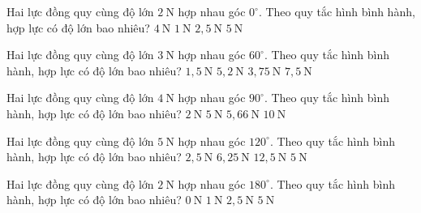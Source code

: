 \begin{ex}
Hai lực đồng quy cùng độ lớn $2\ \mathrm{N}$ hợp nhau góc $0^\circ$. Theo quy tắc hình bình hành, hợp lực có độ lớn bao nhiêu?
\choice
{\True $4\ \mathrm{N}$}
{$1\ \mathrm{N}$}
{$2,5\ \mathrm{N}$}
{$5\ \mathrm{N}$}
\end{ex}

\begin{ex}
Hai lực đồng quy cùng độ lớn $3\ \mathrm{N}$ hợp nhau góc $60^\circ$. Theo quy tắc hình bình hành, hợp lực có độ lớn bao nhiêu?
\choice
{$1,5\ \mathrm{N}$}
{\True $5,2\ \mathrm{N}$}
{$3,75\ \mathrm{N}$}
{$7,5\ \mathrm{N}$}
\end{ex}

\begin{ex}
Hai lực đồng quy cùng độ lớn $4\ \mathrm{N}$ hợp nhau góc $90^\circ$. Theo quy tắc hình bình hành, hợp lực có độ lớn bao nhiêu?
\choice
{$2\ \mathrm{N}$}
{$5\ \mathrm{N}$}
{\True $5,66\ \mathrm{N}$}
{$10\ \mathrm{N}$}
\end{ex}

\begin{ex}
Hai lực đồng quy cùng độ lớn $5\ \mathrm{N}$ hợp nhau góc $120^\circ$. Theo quy tắc hình bình hành, hợp lực có độ lớn bao nhiêu?
\choice
{$2,5\ \mathrm{N}$}
{$6,25\ \mathrm{N}$}
{$12,5\ \mathrm{N}$}
{\True $5\ \mathrm{N}$}
\end{ex}

\begin{ex}
Hai lực đồng quy cùng độ lớn $2\ \mathrm{N}$ hợp nhau góc $180^\circ$. Theo quy tắc hình bình hành, hợp lực có độ lớn bao nhiêu?
\choice
{\True $0\ \mathrm{N}$}
{$1\ \mathrm{N}$}
{$2,5\ \mathrm{N}$}
{$5\ \mathrm{N}$}
\end{ex}

